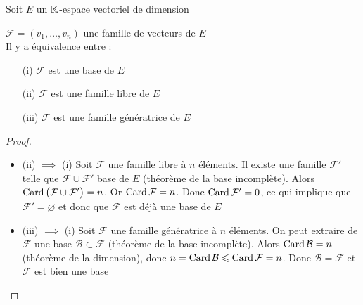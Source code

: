 \begin{frame}
Soit $E$ un $\mathbb{K}$-espace vectoriel de dimension 
\begin{theoreme}
$\mathcal{F}=(v_1,\ldots,v_n)$ une famille de  vecteurs de $E$ \\
Il y a équivalence entre :
\begin{itemize}
  \item[(i)] $\mathcal{F}$ est une base de $E$
  
  \item[(ii)] $\mathcal{F}$ est une famille libre de $E$
  
  \item[(iii)] $\mathcal{F}$ est une famille génératrice de $E$
\end{itemize}
\end{theoreme}
\pause
\begin{proof}
\begin{itemize}  
  \item (ii) $\implies$ (i) Soit $\mathcal{F}$ une famille libre à $n$ éléments.
  Il existe une famille $\mathcal{F}'$ telle que
$\mathcal{F} \cup \mathcal{F}'$  base de $E$ (th\'eor\`eme de la base incompl\`ete). Alors
 $\mathop{\text{Card}}\nolimits \big(\mathcal{F} \cup \mathcal{F}'\big)=n$. Or
$\mathop{\text{Card}}\nolimits \mathcal{F}=n$. Donc $\mathop{\text{Card}}\nolimits \mathcal{F}'=0$, ce qui implique que  $\mathcal{F}'=\varnothing$ et donc que 
$\mathcal{F}$ est déjà une base de $E$
  \pause
  \item (iii) $\implies$ (i) Soit $\mathcal{F}$ une famille génératrice \`a $n$ \'el\'ements.
On peut extraire de $\mathcal{F}$ une base $\mathcal{B} \subset \mathcal{F}$ (th\'eor\`eme de la base incompl\`ete).
Alors  $\mathop{\text{Card}}\nolimits \mathcal{B}=n$ (th\'eor\`eme de la dimension), donc
$n = \mathop{\text{Card}}\nolimits \mathcal{B} \leqslant \mathop{\text{Card}}\nolimits \mathcal{F}=n$. Donc $\mathcal{B} = \mathcal{F}$ et 
$\mathcal{F}$ est bien une base \qedhere
\end{itemize}
\end{proof}
\end{frame}


